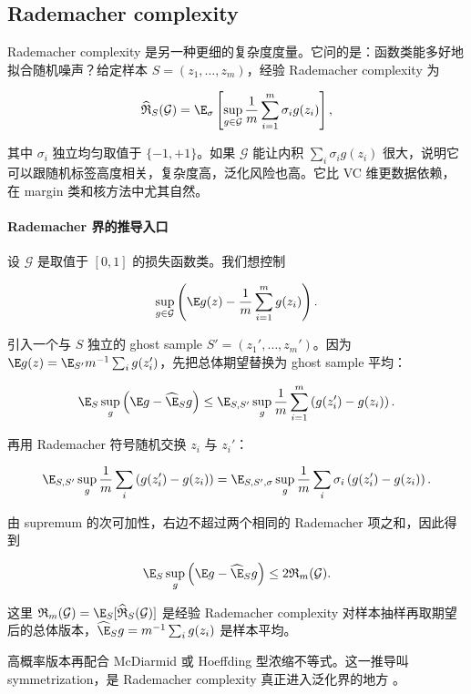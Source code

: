 \subsection{Rademacher complexity}

Rademacher complexity 是另一种更细的复杂度度量。它问的是：函数类能多好地拟合随机噪声？给定样本 \(S=(z_1,\ldots,z_m)\)，经验 Rademacher complexity 为

\[
  \widehat{\mathfrak{R}}_S(\mathcal{G})
  =
  \E_{\sigma}
  \left[
    \sup_{g\in\mathcal{G}}
    \frac1m
    \sum_{i=1}^{m}\sigma_i g(z_i)
  \right],
\]

其中 \(\sigma_i\) 独立均匀取值于 \(\{-1,+1\}\)。如果 \(\mathcal{G}\) 能让内积 \(\sum_i\sigma_i g(z_i)\) 很大，说明它可以跟随机标签高度相关，复杂度高，泛化风险也高。它比 VC 维更数据依赖，在 margin 类和核方法中尤其自然。

\paragraph{Rademacher 界的推导入口}

设 \(\mathcal{G}\) 是取值于 \([0,1]\) 的损失函数类。我们想控制

\[
  \sup_{g\in\mathcal{G}}
  \left(
    \E g(z)-\frac1m\sum_{i=1}^{m}g(z_i)
  \right).
\]

引入一个与 \(S\) 独立的 ghost sample \(S'=(z_1',\ldots,z_m')\)。因为 \(\E g(z)=\E_{S'}m^{-1}\sum_i g(z_i')\)，先把总体期望替换为 ghost sample 平均：

\[
  \E_S
  \sup_g
  \left(
    \E g-\widehat{\E}_S g
  \right)
  \le
  \E_{S,S'}
  \sup_g
  \frac1m
  \sum_{i=1}^{m}
  \left(g(z_i')-g(z_i)\right).
\]

再用 Rademacher 符号随机交换 \(z_i\) 与 \(z_i'\)：

\[
  \E_{S,S'}
  \sup_g
  \frac1m
  \sum_i
  \left(g(z_i')-g(z_i)\right)
  =
  \E_{S,S',\sigma}
  \sup_g
  \frac1m
  \sum_i
  \sigma_i
  \left(g(z_i')-g(z_i)\right).
\]

由 supremum 的次可加性，右边不超过两个相同的 Rademacher 项之和，因此得到

\[
  \E_S
  \sup_g
  \left(
    \E g-\widehat{\E}_S g
  \right)
  \le
  2\mathfrak{R}_m(\mathcal{G}).
\]

这里 \(\mathfrak{R}_m(\mathcal{G})=\E_S[\widehat{\mathfrak{R}}_S(\mathcal{G})]\) 是经验 Rademacher complexity 对样本抽样再取期望后的总体版本，\(\widehat{\E}_S g=m^{-1}\sum_i g(z_i)\) 是样本平均。

高概率版本再配合 McDiarmid 或 Hoeffding 型浓缩不等式。这一推导叫 symmetrization，是 Rademacher complexity 真正进入泛化界的地方 \parencite{mohri2018foundations}。

